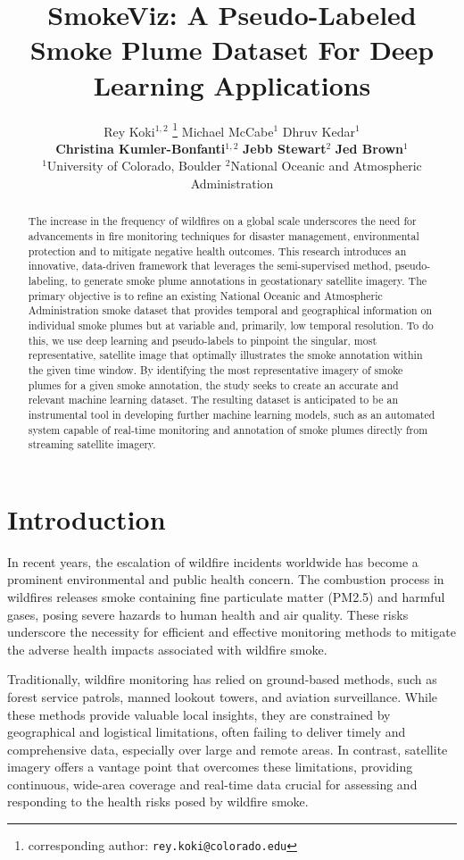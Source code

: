 \documentclass{article}
\title{SmokeViz: A Pseudo-Labeled Smoke Plume Dataset For Deep Learning Applications}
\author{%
    Rey Koki\(^{1,2}\)  \thanks{corresponding author: \texttt{rey.koki@colorado.edu} } \quad Michael McCabe\(^{1}\) \quad Dhruv Kedar\(^{1}\)\\ 
    \textbf{Christina Kumler-Bonfanti}\(^{1,2}\) \quad \textbf{Jebb Stewart}\(^{2}\) \quad  \textbf{Jed Brown}\(^{1}\) \\
    \(^1\)University of Colorado, Boulder \quad \(^2\)National Oceanic and Atmospheric Administration\\
}
\begin{document}
\maketitle


\begin{abstract}
The increase in the frequency of wildfires on a global scale underscores the need for advancements in fire monitoring techniques for disaster management, environmental protection and to mitigate negative health outcomes. This research introduces an innovative, data-driven framework that leverages the semi-supervised method, pseudo-labeling, to generate smoke plume annotations in geostationary satellite imagery. The primary objective is to refine an existing National Oceanic and Atmospheric Administration smoke dataset that provides temporal and geographical information on individual smoke plumes but at variable and, primarily, low temporal resolution. To do this, we use deep learning and pseudo-labels to pinpoint the singular, most representative, satellite image that optimally illustrates the smoke annotation within the given time window. By identifying the most representative imagery of smoke plumes for a given smoke annotation, the study seeks to create an accurate and relevant machine learning dataset. The resulting dataset is anticipated to be an instrumental tool in developing further machine learning models, such as an automated system capable of real-time monitoring and annotation of smoke plumes directly from streaming satellite imagery.
\end{abstract}


\section{Introduction}

In recent years, the escalation of wildfire incidents worldwide has become a prominent environmental and public health concern. The combustion process in wildfires releases smoke containing fine particulate matter (PM2.5) and harmful gases, posing severe hazards to human health and air quality. These risks underscore the necessity for efficient and effective monitoring methods to mitigate the adverse health impacts associated with wildfire smoke. 

Traditionally, wildfire monitoring has relied on ground-based methods, such as forest service patrols, manned lookout towers, and aviation surveillance. While these methods provide valuable local insights, they are constrained by geographical and logistical limitations, often failing to deliver timely and comprehensive data, especially over large and remote areas. In contrast, satellite imagery offers a vantage point that overcomes these limitations, providing continuous, wide-area coverage and real-time data crucial for assessing and responding to the health risks posed by wildfire smoke.
\end{document}
